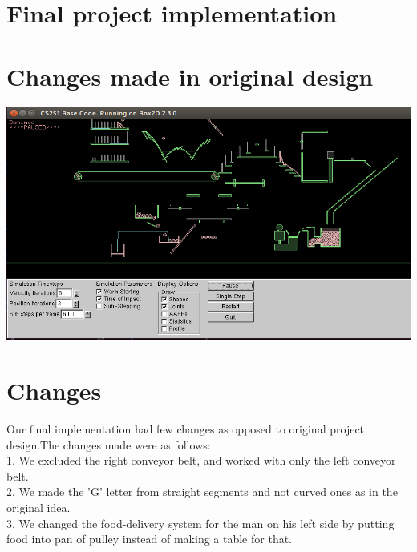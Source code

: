 \documentclass{report}
\begin{document}
\section{Final project implementation}


\newpage
\section{Changes made in original design}
\includegraphics[scale=0.5]{./doc/final_design.png}
\newpage

\section{Changes}
Our final implementation had few changes as opposed to original project design.The changes made were as follows:\\
1. We excluded the right conveyor belt, and worked with only the left conveyor belt.\\
2. We made the 'G' letter from straight segments and not curved ones as in the original idea.\\
3. We changed the food-delivery system for the man on his left side by putting food into pan of pulley instead of making a table for that. \\
\newpage
\end{document}
